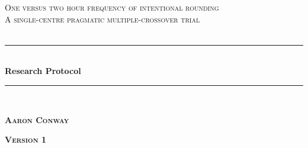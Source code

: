 \documentclass[12pt]{article}
\begin{document}
\begin{titlepage}

\newcommand{\HRule}{\rule{\linewidth}{0.5mm}} %

\center %
 

\textsc{\LARGE One versus two hour frequency of intentional rounding}\\[1.5cm] %
\textsc{\Large A single-centre pragmatic multiple-crossover trial}\\[0.5cm] %
\textsc{\large }\\[0.5cm] %


\HRule \\[0.6cm]
{ \huge \bfseries Research Protocol}\\[0.4cm] %
\HRule \\[1.0cm]
 

\begin{center} \large
\medskip
{\textsc{\textbf{Aaron Conway} }}    
\end{center}

\begin{center} \Large
{\textsc{\textbf{Version 1} }} 
\end{center}

~


\end{titlepage}
\end{document}

